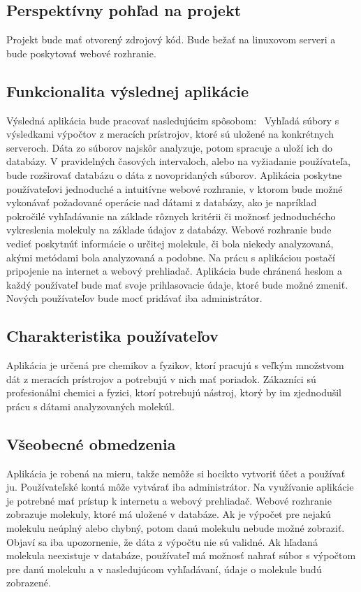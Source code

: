 \documentclass[12pt,a4paper]{article}
\begin{document}
\subsection{Perspektívny pohľad na projekt}
Projekt bude mať otvorený zdrojový kód. Bude bežať na linuxovom serveri a bude poskytovať webové rozhranie.


\subsection{Funkcionalita výslednej aplikácie}
Výsledná aplikácia bude pracovať nasledujúcim spôsobom: \
Vyhľadá súbory s výsledkami výpočtov z meracích prístrojov, ktoré sú uložené na konkrétnych serveroch. Dáta zo súborov najskôr analyzuje, potom spracuje a uloží ich do databázy.
V pravidelných časových intervaloch, alebo na vyžiadanie používateľa, bude rozširovať databázu o dáta z novopridaných súborov. Aplikácia poskytne používateľovi jednoduché a intuitívne webové rozhranie, v ktorom bude možné vykonávať požadované operácie nad dátami z databázy, ako je napríklad pokročilé vyhľadávanie na základe rôznych kritérii či možnosť jednoduchécho vykreslenia molekuly na základe údajov z databázy. Webové rozhranie bude vedieť poskytnúť informácie o určitej molekule, či bola niekedy analyzovaná, akými metódami bola analyzovaná a podobne. Na prácu s aplikáciou postačí pripojenie na internet a webový prehliadač. Aplikácia bude chránená heslom a každý používateľ bude mať svoje prihlasovacie údaje, ktoré bude možné zmeniť. Nových používateľov bude mocť pridávať iba administrátor.

\subsection{Charakteristika používateľov}
Aplikácia je určená pre chemikov a fyzikov, ktorí pracujú s veľkým množstvom dát z meracích prístrojov a potrebujú v nich mať poriadok. Zákazníci sú profesionálni chemici a fyzici, ktorí potrebujú nástroj, ktorý by im zjednodušil prácu s dátami analyzovaných molekúl.

\subsection{Všeobecné obmedzenia}
Aplikácia je robená na mieru, takže nemôže si hocikto vytvoriť účet a používať ju. Používateľské kontá môže vytvárať iba administrátor. Na využívanie aplikácie je potrebné mať prístup k internetu a webový prehliadač. Webové rozhranie zobrazuje molekuly, ktoré má uložené v databáze. Ak je výpočet pre nejakú molekulu neúplný alebo chybný, potom danú molekulu nebude možné zobraziť. Objaví sa iba upozornenie, že dáta z výpočtu nie sú validné. Ak hľadaná molekula neexistuje v databáze, používateľ má možnosť nahrať súbor s výpočtom pre danú molekulu a v nasledujúcom vyhľadávaní, údaje o molekule budú zobrazené.
\end{document}

